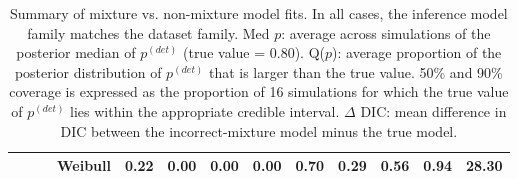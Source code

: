 \documentclass[12pt]{article}
\newcommand{\pdet}{p^{(det)}}
\begin{document}
\begin{table}[ht]
\begin{tabular}{l|l|l|l|cccc|cccc||r}
 & & &   Weibull & 0.22 & 0.00 & 0.00 & 0.00 & 0.70 & 0.29 & 0.56 & 0.94 & 28.30 \\ 
   \hline
\end{tabular}
\caption{Summary of mixture vs. non-mixture model fits.  
In all cases, the inference model family matches the dataset family.  
Med $p$: average across simulations of the posterior median of $\pdet$ (true value = 0.80).  
Q($p$): average proportion of the posterior distribution of $\pdet$ that is larger than the true value.  
50\% and 90\% coverage is expressed as the proportion of 16 simulations for which the true value of $\pdet$ lies within the appropriate credible interval.  
$\Delta$ DIC: mean difference in DIC between the incorrect-mixture model minus the true model.
}
\label{tbl:sim1}
\end{table}

\else
\end{document}
